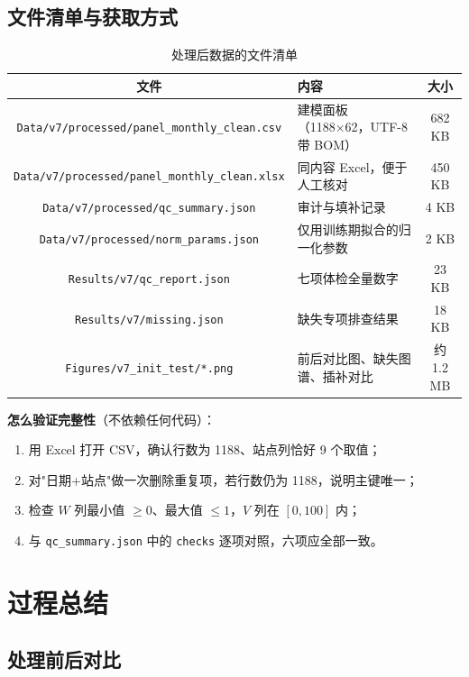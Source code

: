 \documentclass[11pt,a4paper]{ctexart}
\begin{document}
\subsection{文件清单与获取方式}

\begin{table}[H]\centering\small
\begin{tabularx}{\textwidth}{|c|X|c|}
\toprule
文件 & 内容 & 大小 \\
\midrule
\texttt{Data/v7/processed/panel\_monthly\_clean.csv} & 建模面板（1188×62，UTF-8 带 BOM） & 682 KB \\
\texttt{Data/v7/processed/panel\_monthly\_clean.xlsx} & 同内容 Excel，便于人工核对 & 450 KB \\
\texttt{Data/v7/processed/qc\_summary.json} & 审计与填补记录 & 4 KB \\
\texttt{Data/v7/processed/norm\_params.json} & 仅用训练期拟合的归一化参数 & 2 KB \\
\texttt{Results/v7/qc\_report.json} & 七项体检全量数字 & 23 KB \\
\texttt{Results/v7/missing.json} & 缺失专项排查结果 & 18 KB \\
\texttt{Figures/v7\_init\_test/*.png} & 前后对比图、缺失图谱、插补对比 & 约 1.2 MB \\
\bottomrule
\end{tabularx}
\caption{处理后数据的文件清单}
\end{table}

\noindent\textbf{怎么验证完整性}（不依赖任何代码）：
\begin{enumerate}
\item 用 Excel 打开 CSV，确认行数为 1188、站点列恰好 9 个取值；
\item 对"日期+站点"做一次删除重复项，若行数仍为 1188，说明主键唯一；
\item 检查 $W$ 列最小值 $\ge0$、最大值 $\le1$，$V$ 列在 $[0,100]$ 内；
\item 与 \texttt{qc\_summary.json} 中的 \texttt{checks} 逐项对照，六项应全部一致。
\end{enumerate}

\section{过程总结}

\subsection{处理前后对比}
\end{document}
